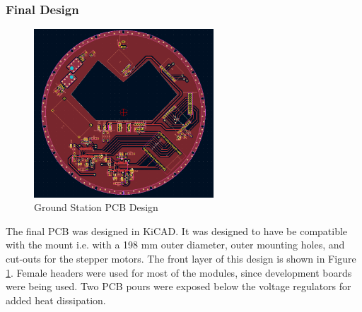 \subsubsection{Final Design}
\begin{figure}[!htb]
  \centering
  \includegraphics[width=0.6\textwidth]{gs_pcb_design}
  \caption{Ground Station PCB Design}
  \label{fig:gs_pcb}
\end{figure}
The final PCB was designed in KiCAD. It was designed to have be compatible with the mount i.e. with a 198 mm outer diameter, outer mounting holes, and cut-outs for the stepper motors. The front layer of this design is shown in Figure \ref{fig:gs_pcb}. Female headers were used for most of the modules, since development boards were being used. Two PCB pours were exposed below the voltage regulators for added heat dissipation.